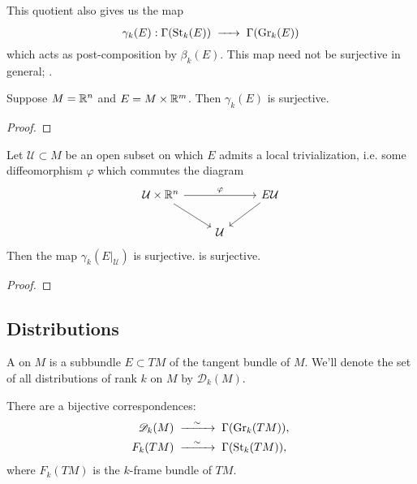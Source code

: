 \documentclass{lkx_paper}
\begin{document}
This quotient also gives us the map
\[
	\gamma_k(E) : \Gamma(\St_k(E)) \longto \Gamma(\Gr_k(E))
\]
which acts as post-composition by $\beta_{k}(E)$. This map need not be surjective in general; .

\begin{proposition}
	Suppose $M=\mathbb{R}^n$ and $E=M\times \mathbb{R}^m$. Then $\gamma_k(E)$ is surjective.
\end{proposition}

\begin{proof}
\end{proof}

\begin{proposition}
	Let $\mathcal{U}\subset M$ be an open subset on which $E$ admits a local trivialization, i.e. some diffeomorphism $\varphi$ which commutes the diagram
	\[\begin{tikzcd}
			{\mathcal{U}\times\R^n} && {E\mathcal{U}} \\
			& {\mathcal{U}}
			\arrow["\varphi", from=1-1, to=1-3]
			\arrow[from=1-1, to=2-2]
			\arrow[from=1-3, to=2-2]
		\end{tikzcd}\]
	Then the map $\gamma_k(E|_\mathcal{U})$ is surjective.
	is surjective.
\end{proposition}

\begin{proof}
\end{proof}

\subsection{Distributions}

\begin{definition}
	A  on $M$ is a subbundle $E\subset TM$ of the tangent bundle of $M$. We'll denote the set of all distributions of rank $k$ on $M$ by $\mathscr{D}_k(M)$.
\end{definition}

\begin{proposition}
	There are a bijective correspondences:
	\[
		\begin{aligned}
			\mathscr{D}_k(M) & \longisom \Gamma(\Gr_k(TM)), \\
			F_k(TM)          & \longisom \Gamma(\St_k(TM)), \\
		\end{aligned}
	\]
	where $F_k(TM)$ is the $k$-frame bundle of $TM$.
\end{proposition}
\end{document}
